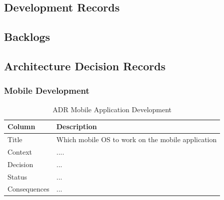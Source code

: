 \documentclass[12pt,a4paper]{article}
\begin{document}
    \begin{appendices}                  
      \section{Development Records}
        \subsection{Backlogs}\label{appendix:backlogs}
          
          
        \subsection{Architecture Decision Records}\label{appendix:Architecture Decision Records}
          \subsubsection{Mobile Development}
            \begin{table}[H]
              \centering
                \begin{tabularx}{\textwidth}{l X}
                  \hline
                  Column & Description  \\ \hline
                  Title & Which mobile OS to work on the mobile application \\ 
                  Context & ....  \\ 
                  Decision & ...  \\ 
                  Status & ... \\ 
                  Consequences & ... \\                  
                  \hline
                \end{tabularx}
                \caption[Table caption text]{ADR Mobile Application Development}
                \label{table:ADR Mobile Application Development}
            \end{table}


\end{appendices}
\end{document}
